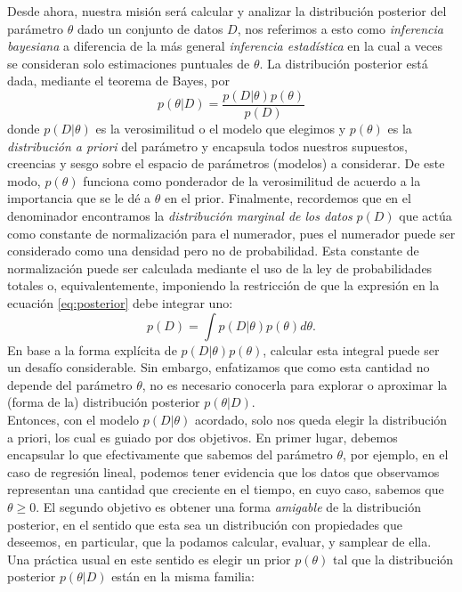 Desde ahora, nuestra misión será calcular y analizar la distribución posterior del parámetro $\theta$ dado un conjunto de datos $D$, nos referimos a esto como \emph{inferencia bayesiana} a diferencia de la más general \emph{inferencia estadística} en la cual a veces se consideran solo estimaciones puntuales de $\theta$. La distribución posterior está dada, mediante el teorema de Bayes, por
\begin{equation}
	p(\theta|D)=\frac{p(D|\theta)p(\theta)}{p(D)}
	\label{eq:posterior}
\end{equation}
donde $p(D|\theta)$ es la verosimilitud o el modelo que elegimos y $p(\theta)$ es la \emph{distribución a priori} del parámetro y encapsula todos nuestros supuestos, creencias y sesgo sobre el espacio de parámetros (modelos) a considerar. De este modo, $p(\theta)$ funciona como ponderador de la verosimilitud de acuerdo a la importancia que se le dé a $\theta$ en el prior. Finalmente, recordemos que en el denominador encontramos la  \emph{distribución marginal de los datos} $p(D)$ que actúa como constante de normalización para el numerador, pues el numerador puede ser considerado como una densidad pero no de probabilidad. Esta constante de normalización puede ser calculada mediante el uso de la ley de probabilidades totales o, equivalentemente, imponiendo la restricción de que la expresión en la ecuación \eqref{eq:posterior} debe integrar uno:
\begin{equation}
	p(D) = \int p(D|\theta)p(\theta)d\theta.
\end{equation}
En base a la forma explícita de $p(D|\theta)p(\theta)$, calcular esta integral puede ser un desafío considerable. Sin embargo, enfatizamos que como esta cantidad no depende del parámetro $\theta$, no es necesario conocerla para explorar o aproximar la (forma de la) distribución posterior $p(\theta|D)$.\\ 

Entonces, con el modelo $p(D|\theta)$ acordado, solo nos queda elegir la distribución a priori, los cual es guiado por dos objetivos. En primer lugar, debemos encapsular lo que efectivamente que sabemos del parámetro $\theta$, por ejemplo, en el caso de regresión lineal, podemos tener evidencia que los datos que observamos representan una cantidad que creciente en el tiempo, en cuyo caso, sabemos que $\theta\geq 0$. El segundo objetivo es obtener una forma \emph{amigable} de la distribución posterior, en el sentido que esta sea un distribución con propiedades que deseemos, en particular, que la podamos calcular, evaluar, y samplear de ella. Una práctica usual en este sentido es elegir un prior $p(\theta)$ tal que la distribución posterior $p(\theta|D)$ están en la misma familia:


